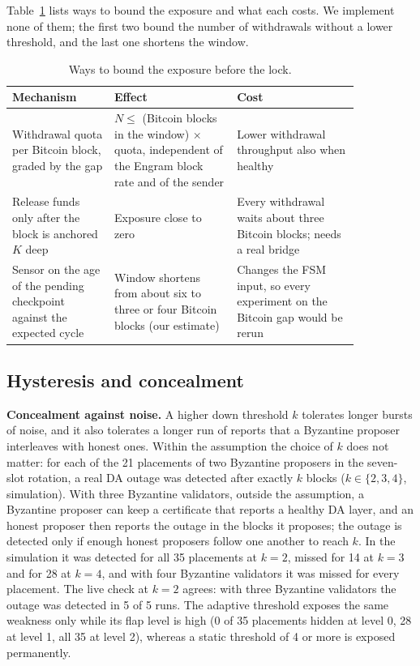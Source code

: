 Table~\ref{tab:exposure-design} lists ways to bound the exposure and what each
costs. We implement none of them; the first two bound the number of withdrawals
without a lower threshold, and the last one shortens the window.

\begin{table}[tbp]
\caption{Ways to bound the exposure before the lock.}
\label{tab:exposure-design}
\centering
\footnotesize
\begin{tabular}{@{}p{0.25\linewidth}p{0.3\linewidth}p{0.3\linewidth}@{}}
\toprule
\textbf{Mechanism} & \textbf{Effect} & \textbf{Cost} \\
\midrule
Withdrawal quota per Bitcoin block, graded by the gap & $N \le$ (Bitcoin blocks in the window) $\times$ quota, independent of the Engram block rate and of the sender & Lower withdrawal throughput also when healthy \\
Release funds only after the block is anchored $K$ deep & Exposure close to zero & Every withdrawal waits about three Bitcoin blocks; needs a real bridge \\
Sensor on the age of the pending checkpoint against the expected cycle & Window shortens from about six to three or four Bitcoin blocks (our estimate) & Changes the FSM input, so every experiment on the Bitcoin gap would be rerun \\
\bottomrule
\end{tabular}
\end{table}


\subsection*{Hysteresis and concealment}

\textbf{Concealment against noise.} A higher down threshold $k$
tolerates longer bursts of noise, and it also tolerates a longer run of reports
that a Byzantine proposer interleaves with honest ones. Within the assumption
the choice of $k$ does not matter: for each of the 21 placements of two
Byzantine proposers in the seven-slot rotation, a real DA outage was detected
after exactly $k$ blocks ($k\in\{2,3,4\}$, simulation). With three Byzantine
validators, outside the assumption, a Byzantine proposer can keep a certificate
that reports a healthy DA layer, and an honest proposer then reports the outage
in the blocks it proposes; the outage is detected only if enough honest
proposers follow one another to reach $k$. In the simulation it was detected for all 35
placements at $k{=}2$, missed for 14 at $k{=}3$ and for 28 at $k{=}4$, and with
four Byzantine validators it was missed for every placement. The live check at
$k{=}2$ agrees: with three Byzantine validators the outage was detected in 5 of
5 runs. The adaptive threshold exposes the same
weakness only while its flap level is high (0 of 35 placements hidden at level 0,
28 at level 1, all 35 at level 2), whereas a static threshold of 4 or more is
exposed permanently.

